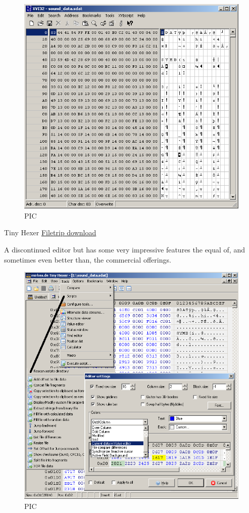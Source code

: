 \documentclass[
]{book}
\begin{document}
\begin{figure}
\centering
\includegraphics{images/4_home_fast6191_romhackingguide_unrenamed_files___rs_romhackingguidehexeditorsshowcaseXVI32_1.png}
\caption{PIC}
\end{figure}

Tiny Hexer \href{http://filetrip.net/pc-downloads/applications/download-tiny-hexer-1816-f29009.html}{Filetrip download}

A discontinued editor but has some very impressive features the equal of, and sometimes even better than, the commercial offerings.

\begin{figure}
\centering
\includegraphics{images/5_home_fast6191_romhackingguide_unrenamed_files___romhackingguidehexeditorsshowcasetinyhexer1.png}
\caption{PIC}
\end{figure}
\end{document}
